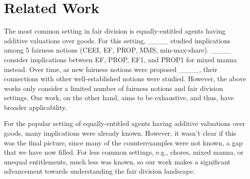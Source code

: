 \section{Related Work}
The most common setting in fair division is equally-entitled agents
having additive valuations over goods. For this setting, ____
studied implications among 5 fairness notions (CEEI, EF, PROP, MMS, min-max-share).
____ consider implications between EF, PROP, EF1, and PROP1 for mixed manna instead.
Over time, as new fairness notions were proposed
____,
their connections with other well-established notions were studied.
However, the above works only consider a limited number of fairness notions and fair division settings.
Our work, on the other hand, aims to be exhaustive, and thus, have broader applicability.

For the popular setting of equally-entitled agents having additive valuations over goods,
many implications were already known. However, it wasn't clear if this was the final picture,
since many of the counterexamples were not known, a gap that we have now filled.
For less common settings, e.g., chores, mixed manna, or unequal entitlements, much less was known,
so our work makes a significant advancement towards understanding the fair division landscape.